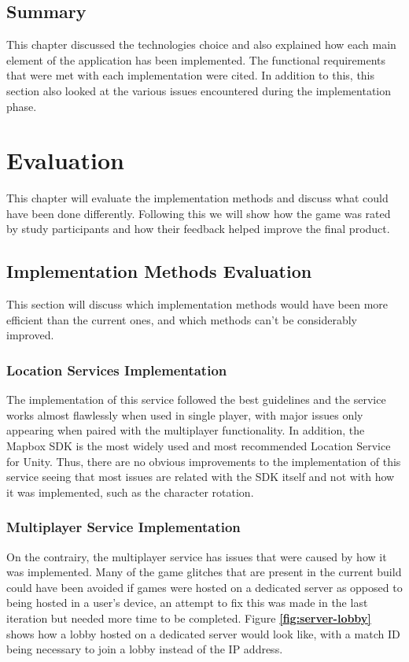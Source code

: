 \documentclass{dissertation}
\begin{document}
\section{Summary}
This chapter discussed the technologies choice and also explained how each main element of the application has been implemented. The functional requirements that were met with each implementation were cited. In addition to this, this section also looked at the various issues encountered during the implementation phase.

\chapter{Evaluation}

This chapter will evaluate the implementation methods and discuss what could have been done differently. Following this we will show how the game was rated by study participants and how their feedback helped improve the final product.

\section{Implementation Methods Evaluation}

This section will discuss which implementation methods would have been more efficient than the current ones, and which methods can't be considerably improved.

\subsection{Location Services Implementation}
The implementation of this service followed the best guidelines and the service works almost flawlessly when used in single player, with major issues only appearing when paired with the multiplayer functionality. In addition, the Mapbox SDK is the most widely used and most recommended Location Service for Unity. Thus, there are no obvious improvements to the implementation of this service seeing that most issues are related with the SDK itself and not with how it was implemented, such as the character rotation.

\subsection{Multiplayer Service Implementation}
On the contrairy, the multiplayer service has issues that were caused by how it was implemented. Many of the game glitches that are present in the current build could have been avoided if games were hosted on a dedicated server as opposed to being hosted in a user's device, an attempt to fix this was made in the last iteration but needed more time to be completed. Figure \textbf{\ref{fig:server-lobby}} shows how a lobby hosted on a dedicated server would look like, with a match ID being necessary to join a lobby instead of the IP address.
\end{document}
